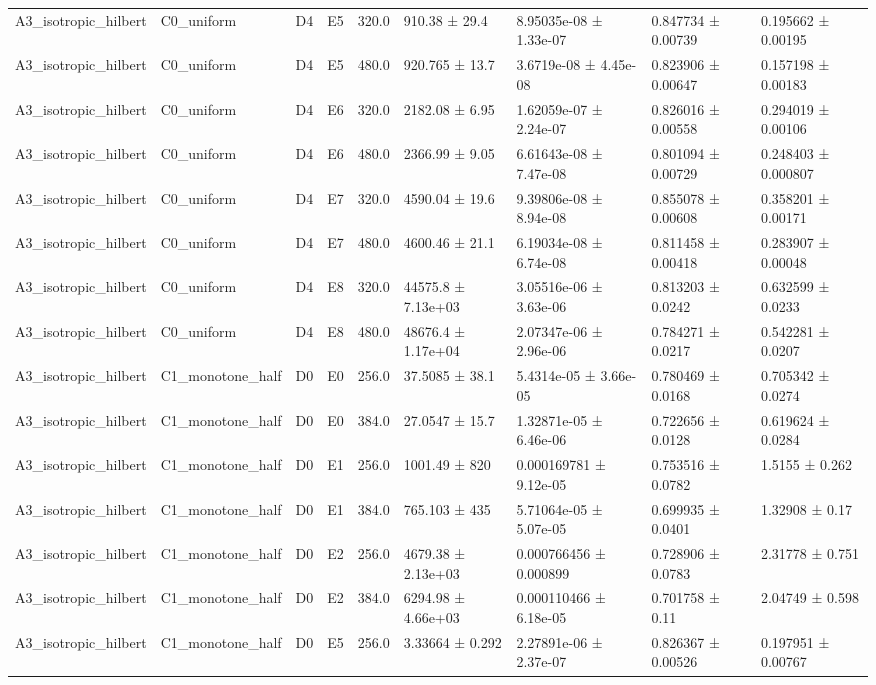 \begin{table}
\begin{tabular}{lllllllll}
A3\_isotropic\_hilbert & C0\_uniform & D4 & E5 & 320.0 & 910.38 ± 29.4 & 8.95035e-08 ± 1.33e-07 & 0.847734 ± 0.00739 & 0.195662 ± 0.00195 \\
A3\_isotropic\_hilbert & C0\_uniform & D4 & E5 & 480.0 & 920.765 ± 13.7 & 3.6719e-08 ± 4.45e-08 & 0.823906 ± 0.00647 & 0.157198 ± 0.00183 \\
A3\_isotropic\_hilbert & C0\_uniform & D4 & E6 & 320.0 & 2182.08 ± 6.95 & 1.62059e-07 ± 2.24e-07 & 0.826016 ± 0.00558 & 0.294019 ± 0.00106 \\
A3\_isotropic\_hilbert & C0\_uniform & D4 & E6 & 480.0 & 2366.99 ± 9.05 & 6.61643e-08 ± 7.47e-08 & 0.801094 ± 0.00729 & 0.248403 ± 0.000807 \\
A3\_isotropic\_hilbert & C0\_uniform & D4 & E7 & 320.0 & 4590.04 ± 19.6 & 9.39806e-08 ± 8.94e-08 & 0.855078 ± 0.00608 & 0.358201 ± 0.00171 \\
A3\_isotropic\_hilbert & C0\_uniform & D4 & E7 & 480.0 & 4600.46 ± 21.1 & 6.19034e-08 ± 6.74e-08 & 0.811458 ± 0.00418 & 0.283907 ± 0.00048 \\
A3\_isotropic\_hilbert & C0\_uniform & D4 & E8 & 320.0 & 44575.8 ± 7.13e+03 & 3.05516e-06 ± 3.63e-06 & 0.813203 ± 0.0242 & 0.632599 ± 0.0233 \\
A3\_isotropic\_hilbert & C0\_uniform & D4 & E8 & 480.0 & 48676.4 ± 1.17e+04 & 2.07347e-06 ± 2.96e-06 & 0.784271 ± 0.0217 & 0.542281 ± 0.0207 \\
A3\_isotropic\_hilbert & C1\_monotone\_half & D0 & E0 & 256.0 & 37.5085 ± 38.1 & 5.4314e-05 ± 3.66e-05 & 0.780469 ± 0.0168 & 0.705342 ± 0.0274 \\
A3\_isotropic\_hilbert & C1\_monotone\_half & D0 & E0 & 384.0 & 27.0547 ± 15.7 & 1.32871e-05 ± 6.46e-06 & 0.722656 ± 0.0128 & 0.619624 ± 0.0284 \\
A3\_isotropic\_hilbert & C1\_monotone\_half & D0 & E1 & 256.0 & 1001.49 ± 820 & 0.000169781 ± 9.12e-05 & 0.753516 ± 0.0782 & 1.5155 ± 0.262 \\
A3\_isotropic\_hilbert & C1\_monotone\_half & D0 & E1 & 384.0 & 765.103 ± 435 & 5.71064e-05 ± 5.07e-05 & 0.699935 ± 0.0401 & 1.32908 ± 0.17 \\
A3\_isotropic\_hilbert & C1\_monotone\_half & D0 & E2 & 256.0 & 4679.38 ± 2.13e+03 & 0.000766456 ± 0.000899 & 0.728906 ± 0.0783 & 2.31778 ± 0.751 \\
A3\_isotropic\_hilbert & C1\_monotone\_half & D0 & E2 & 384.0 & 6294.98 ± 4.66e+03 & 0.000110466 ± 6.18e-05 & 0.701758 ± 0.11 & 2.04749 ± 0.598 \\
A3\_isotropic\_hilbert & C1\_monotone\_half & D0 & E5 & 256.0 & 3.33664 ± 0.292 & 2.27891e-06 ± 2.37e-07 & 0.826367 ± 0.00526 & 0.197951 ± 0.00767 \\

\end{tabular}
\end{table}
